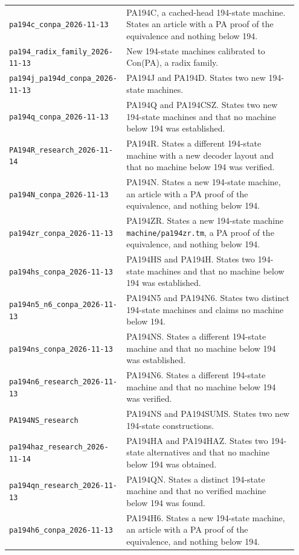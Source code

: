 \begin{longtable}{@{}>{\raggedright\arraybackslash}p{0.36\linewidth}>{\raggedright\arraybackslash}p{0.59\linewidth}@{}}
\nolinkurl{pa194c_conpa_2026-11-13} & PA194C, a cached-head 194-state machine. States an article with a PA proof of the equivalence and nothing below 194.\\[4pt]
\nolinkurl{pa194_radix_family_2026-11-13} & New 194-state machines calibrated to Con(PA), a radix family.\\[4pt]
\nolinkurl{pa194j_pa194d_conpa_2026-11-13} & PA194J and PA194D. States two new 194-state machines.\\[4pt]
\nolinkurl{pa194q_conpa_2026-11-13} & PA194Q and PA194CSZ. States two new 194-state machines and that no machine below 194 was established.\\[4pt]
\nolinkurl{PA194R_research_2026-11-14} & PA194R. States a different 194-state machine with a new decoder layout and that no machine below 194 was verified.\\[4pt]
\nolinkurl{pa194N_conpa_2026-11-13} & PA194N. States a new 194-state machine, an article with a PA proof of the equivalence, and nothing below 194.\\[4pt]
\nolinkurl{pa194zr_conpa_2026-11-13} & PA194ZR. States a new 194-state machine \nolinkurl{machine/pa194zr.tm}, a PA proof of the equivalence, and nothing below 194.\\[4pt]
\nolinkurl{pa194hs_conpa_2026-11-13} & PA194HS and PA194H. States two 194-state machines and that no machine below 194 was established.\\[4pt]
\nolinkurl{pa194n5_n6_conpa_2026-11-13} & PA194N5 and PA194N6. States two distinct 194-state machines and claims no machine below 194.\\[4pt]
\nolinkurl{pa194ns_conpa_2026-11-13} & PA194NS. States a different 194-state machine and that no machine below 194 was established.\\[4pt]
\nolinkurl{pa194n6_research_2026-11-13} & PA194N6. States a different 194-state machine and that no machine below 194 was verified.\\[4pt]
\nolinkurl{PA194NS_research} & PA194NS and PA194SUMS. States two new 194-state constructions.\\[4pt]
\nolinkurl{pa194haz_research_2026-11-14} & PA194HA and PA194HAZ. States two 194-state alternatives and that no machine below 194 was obtained.\\[4pt]
\nolinkurl{pa194qn_research_2026-11-13} & PA194QN. States a distinct 194-state machine and that no verified machine below 194 was found.\\[4pt]
\nolinkurl{pa194h6_conpa_2026-11-13} & PA194H6. States a new 194-state machine, an article with a PA proof of the equivalence, and nothing below 194.\\[4pt]

\end{longtable}
